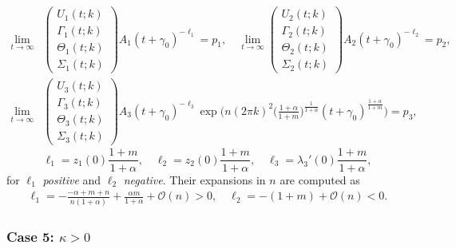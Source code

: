 \documentclass[a4paper,11pt]{article}
\theoremstyle{remark}
\begin{document}
\begin{align*}
\lim_{t \rightarrow \infty}
&\begin{pmatrix}
  U_1(t;k)\\ \Gamma_1(t;k) \\ \Theta_1(t;k) \\ \Sigma_1(t;k)
 \end{pmatrix} A_1(t+\gamma_0)^{-\ell_1} = p_1, \quad
\lim_{t \rightarrow \infty}
\begin{pmatrix}
  U_2(t;k)\\ \Gamma_2(t;k) \\ \Theta_2(t;k) \\ \Sigma_2(t;k)
 \end{pmatrix} A_2(t+\gamma_0)^{-\ell_2} = p_2, \\
\lim_{t \rightarrow \infty}
&\begin{pmatrix}
  U_3(t;k)\\ \Gamma_3(t;k) \\ \Theta_3(t;k) \\ \Sigma_3(t;k)
 \end{pmatrix} A_3(t+\gamma_0)^{-\ell_3}\exp\big(n(2\pi k)^2 \big(\frac{1+\alpha}{1+m}\big)^{\frac{1}{1+\alpha}}(t+\gamma_0)^{\frac{1+\alpha}{1+m}}\big) = p_3,
\end{align*}
$$\ell_1 = z_1(0)\frac{1+m}{1+\alpha}, \quad \ell_2 = z_2(0)\frac{1+m}{1+\alpha}, \quad\ell_3 = \lambda_3'(0)\frac{1+m}{1+\alpha},$$
for $\ell_1$ \emph{positive} and $\ell_2$ \emph{negative}. Their expansions in $n$ are computed as
\begin{align*}
 \ell_1 = -\frac{-\alpha+m+n}{n(1+\alpha)} + \frac{\alpha m}{1+\alpha} + \mathcal{O}(n)>0, \quad
 \ell_2 = -(1+m)  + \mathcal{O}(n)<0.
\end{align*}

\subsubsection{Case 5: $\kappa>0$}
\end{document}
